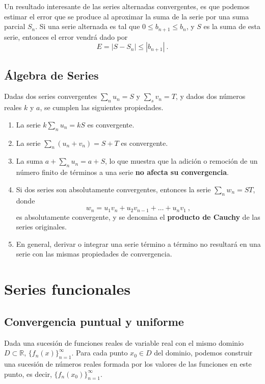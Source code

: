 Un resultado interesante de las series alternadas convergentes, es que podemos estimar el error que se produce al aproximar la suma de la serie por una suma parcial $S_n$. Si una serie alternada es tal que $0 \leq b_{n+1} \leq b_n$, y $S$ es la suma de esta serie, entonces el error vendrá dado por 
\begin{equation}
    E = |S - S_n| \leq |b_{n+1}| \ .
\end{equation}

\subsection{Álgebra de Series}

Dadas dos series convergentes $\sum\limits_n u_n = S$ y $\sum\limits_s v_n = T$, y dados dos números reales $k$ y $a$, se cumplen las siguientes propiedades.
\begin{enumerate}
    \item La serie $k \sum\limits_n u_n = kS$ es convergente.
    \item La serie $\sum\limits_n (u_n + v_n) = S+T$ es convergente.
    \item La suma $a + \sum\limits_n u_n = a+S$, lo que muestra que la adición o remoción de un número finito de términos a una serie \textbf{no afecta su convergencia}.
    \item Si dos series son absolutamente convergentes, entonces la serie $\sum\limits_n w_n = ST$, donde
    \begin{equation*}
        w_n = u_1 v_n + u_2 v_{n-1} + \dots + u_nv_1 \ ,
    \end{equation*}
    es absolutamente convergente, y se denomina el \textbf{producto de Cauchy} de las series originales.
    \item En general, derivar o integrar una serie término a término no resultará en una serie con las mismas propiedades de convergencia.
\end{enumerate}

\section{Series funcionales}

\subsection{Convergencia puntual y uniforme}

Dada una sucesión de funciones reales de variable real con el mismo dominio $D \subset \mathbb{R}$, $\{ f_n(x) \}_{n=1}^\infty$. Para cada punto $x_0 \in D$ del dominio, podemos construir una sucesión de números reales formada por los valores de las funciones en este punto, es decir, $\{ f_n(x_0) \}_{n=1}^\infty$.

